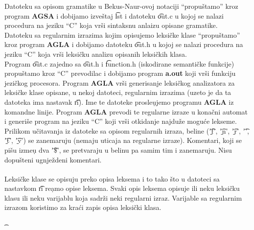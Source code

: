       Datoteku sa opisom gramatike u Bekus-Naur-ovoj notaciji ``propu\v stamo''
      kroz program {\bf AGSA} i dobijamo izve\v staj \t{lst} i datoteku
      \t{out.c} u kojoj se nalazi procedura na jeziku ``C'' koja vr\v si
      sintaksnu anlaizu opisane gramatike.\\
      Datoteku sa regularnim izrazima kojim opisujemo leksi\v cke klase
      ``propu\v stamo'' kroz program {\bf AGLA} i dobijamo
      datoteku \t{out.h} u kojoj se nalazi procedura na jeziku ``C'' koja
      vr\v si leksi\v cku analizu opisanih leksi\v ckih klasa.\\
      Program \t{out.c} zajedno sa \t{out.h} i \t{function.h} (iskodirane
      semanti\v cke funkcije) propu\v stamo kroz ``C'' prevodilac i
      dobijamo program {\bf a.out} koji vr\v si funkciju jezi\v ckog
      procesora.
%
%
    Program {\bf AGLA} vr\v si generisanje leksi\v ckog analizatora za
    leksi\v cke klase opisane, u nekoj datoteci, regularnim izrazima
    (uzeto je da ta datoteka ima nastavak \t{ri}).
    Ime te datoteke prosle\d ujemo programu {\bf AGLA} iz komandne linije.
    Program {\bf AGLA} prevodi te regularne izraze u kona\v cni automat i
    generi\v se program na jeziku ``C'' koji vr\v si otkidanje najdu\v ze
    mogu\'ce lekseme.
%
%
      Prilikom u\v citavanja iz datoteke sa opisom regularnih izraza,
      beline (\t{'{\b}f'}, \t{'{\b}n'}, \t{'{\b}r'}, \t{'\s'}, \t{'{\b}t'},
      \t{'{\b}v'}) se zanemaruju (nemaju uticaja na regularne izraze).
      Komentari, koji se pi\v su izme\d u dva \t{'\$'}, se pretvaraju u
      belinu pa samim tim i zanemaruju.
      Nisu dopu\v steni ugnje\v zdeni komentari.\\
      \\
      Leksi\v cke klase se opisuju preko opisa leksema i to tako \v sto
      u datoteci sa nastavkom \t{ri} re\d amo opise leksema.
      Svaki opis leksema opisuje ili neku leksi\v cku klasu ili neku
      varijablu koja sadr\v zi neki regularni izraz.
      Varijable sa regularnim izrazom koristimo za kra\'ci zapis opisa
      leksi\v cki klasa.\\
      \\
      \t
